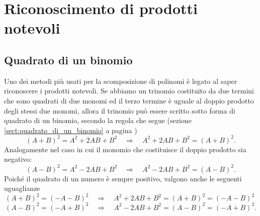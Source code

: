 
\chapter{Riconoscimento di prodotti notevoli}

\section{Quadrato di un binomio}

Uno dei metodi più usati per la scomposizione di polinomi è legato al saper riconoscere i prodotti notevoli.
Se abbiamo un trinomio costituito da due termini che sono quadrati di due monomi ed il terzo termine è uguale al doppio prodotto
degli stessi due monomi, allora il trinomio può essere scritto sotto forma di quadrato di un binomio, secondo la regola che segue (sezione \ref{sect:quadrato_di_un_binomio} a pagina \pageref{sect:quadrato_di_un_binomio})
\begin{equation*}
(A+B)^{2}=A^{2}+2AB+B^{2}\quad \Rightarrow \quad A^{2}+2AB+B^{2}=(A+B)^{2}.
\end{equation*}
Analogamente nel caso in cui il monomio che costituisce il doppio prodotto sia negativo:
\begin{equation*}
(A-B)^{2}=A^{2}-2AB+B^{2}\quad \Rightarrow \quad A^{2}-2AB+B^{2}=(A-B)^{2}.
\end{equation*}
Poiché il quadrato di un numero è sempre positivo, valgono anche le seguenti uguaglianze
\begin{equation*}
(A+B)^{2}=(-A-B)^{2}\quad\Rightarrow\quad A^{2}+2AB+B^{2}=(A+B)^{2}=(-A-B)^{2}\phantom{.}
\end{equation*}
\begin{equation*}
(A-B)^{2}=(-A+B)^{2}\quad \Rightarrow \quad A^{2}-2AB+B^{2}=(A-B)^{2}=(-A+B)^{2}.
\end{equation*}

